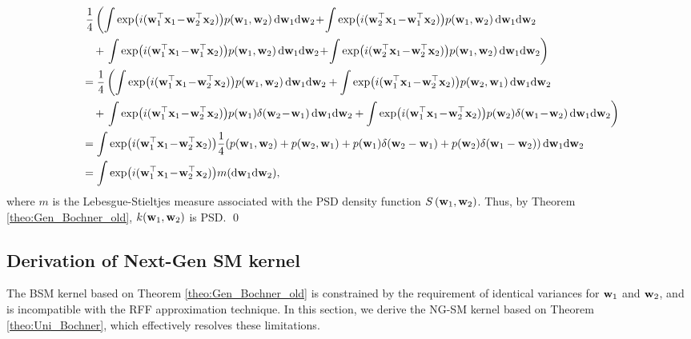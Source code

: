\begin{equation}
\begin{aligned}
&\  \frac{1}{4} \left( \int \exp(i(\w_1^{\top} \x_1 \!-\! \w_2^{\top} \x_2)) p(\w_1, \w_2)\,\mathrm{d}\w_1\mathrm{d}\w_2 \!+\! \int \exp(i(\w_2^{\top} \x_1 \!-\! \w_1^{\top} \x_2)) p(\w_1, \w_2)\,\mathrm{d}\w_1\mathrm{d}\w_2 \right. \\
&\quad + \left. \int \exp(i(\w_1^{\top} \x_1 \!-\! \w_1^{\top} \x_2)) p(\w_1, \w_2)\,\mathrm{d}\w_1\mathrm{d}\w_2 \!+\! \int \exp(i(\w_2^{\top} \x_1 \!-\! \w_2^{\top} \x_2)) p(\w_1, \w_2)\,\mathrm{d}\w_1\mathrm{d}\w_2 \right) \\
& = \frac{1}{4} \left( \int \exp(i(\w_1^{\top} \x_1 \!-\! \w_2^{\top} \x_2)) p(\w_1, \w_2)\,\mathrm{d}\w_1\mathrm{d}\w_2 + \int \exp(i(\w_1^{\top} \x_1 \!-\! \w_2^{\top} \x_2)) p(\w_2, \w_1)\,\mathrm{d}\w_1\mathrm{d}\w_2 \right. \\
& \quad + \left. \int \exp(i(\w_1^{\top} \x_1 \!-\! \w_2^{\top} \x_2)) p(\w_1)\delta(\w_2 \!-\! \w_1)\,\mathrm{d}\w_1\mathrm{d}\w_2 + \int \exp(i(\w_1^{\top} \x_1 \!-\! \w_2^{\top} \x_2)) p(\w_2)\delta(\w_1 \!-\! \w_2)\,\mathrm{d}\w_1\mathrm{d}\w_2 \right) \\
&= \int \exp(i(\w_1^{\top} \x_1 \!-\! \w_2^{\top} \x_2)) \frac{1}{4}(p(\w_1, \w_2) + p(\w_2, \w_1) + p(\w_1)\delta(\w_2 - \w_1) + p(\w_2)\delta(\w_1 - \w_2))\,\mathrm{d}\w_1\mathrm{d}\w_2\\
&= \int \exp(i(\w_1^{\top} \x_1 \!-\! \w_2^{\top} \x_2)) m(\mathrm{d}\w_1\mathrm{d}\w_2),
\end{aligned}
\end{equation}
where \( m \) is the Lebesgue-Stieltjes measure associated with the PSD density function \( S\left({\mathbf w}_1, {\mathbf w}_2\right) \). Thus, by Theorem \ref{theo:Gen_Bochner_old}, $k({\mathbf w}_1,{\mathbf w}_2)$ is PSD. 
\qed

\subsection{Derivation of Next-Gen SM kernel}
\label{app:ng-sm-kernel}
The \MakeUppercase{bsm} kernel based on Theorem \ref{theo:Gen_Bochner_old} is constrained by the requirement of identical variances for \({\mathbf w}_1\) and \({\mathbf w}_2\), and is incompatible with the RFF approximation technique. In this section, we derive the NG-SM kernel based on Theorem \ref{theo:Uni_Bochner}, which effectively resolves these limitations.

